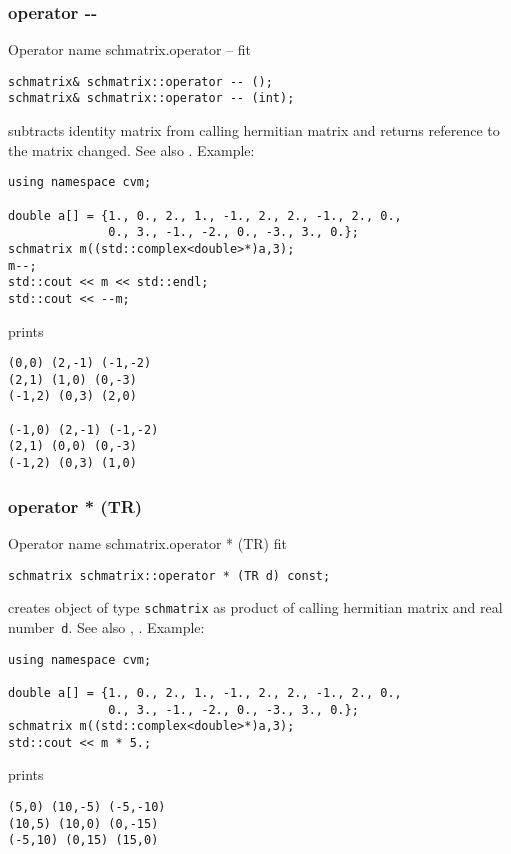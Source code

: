 \subsubsection{operator -{}-}
Operator%
\pdfdest name {schmatrix.operator --} fit
\begin{verbatim}
schmatrix& schmatrix::operator -- ();
schmatrix& schmatrix::operator -- (int);
\end{verbatim}
subtracts identity matrix from  calling hermitian matrix
and returns  reference to
the matrix changed.
See also .
Example:
\begin{Verbatim}
using namespace cvm;

double a[] = {1., 0., 2., 1., -1., 2., 2., -1., 2., 0.,
              0., 3., -1., -2., 0., -3., 3., 0.};
schmatrix m((std::complex<double>*)a,3);
m--;
std::cout << m << std::endl;
std::cout << --m;
\end{Verbatim}
prints
\begin{Verbatim}
(0,0) (2,-1) (-1,-2)
(2,1) (1,0) (0,-3)
(-1,2) (0,3) (2,0)

(-1,0) (2,-1) (-1,-2)
(2,1) (0,0) (0,-3)
(-1,2) (0,3) (1,0)
\end{Verbatim}
\newpage




\subsubsection{operator * (TR)}
Operator%
\pdfdest name {schmatrix.operator * (TR)} fit
\begin{verbatim}
schmatrix schmatrix::operator * (TR d) const;
\end{verbatim}
creates  object of type \verb"schmatrix" as  product of
 calling hermitian matrix and  real number~\verb"d".
See also ,
.
Example:
\begin{Verbatim}
using namespace cvm;

double a[] = {1., 0., 2., 1., -1., 2., 2., -1., 2., 0.,
              0., 3., -1., -2., 0., -3., 3., 0.};
schmatrix m((std::complex<double>*)a,3);
std::cout << m * 5.;
\end{Verbatim}
prints
\begin{Verbatim}
(5,0) (10,-5) (-5,-10)
(10,5) (10,0) (0,-15)
(-5,10) (0,15) (15,0)
\end{Verbatim}
\newpage



